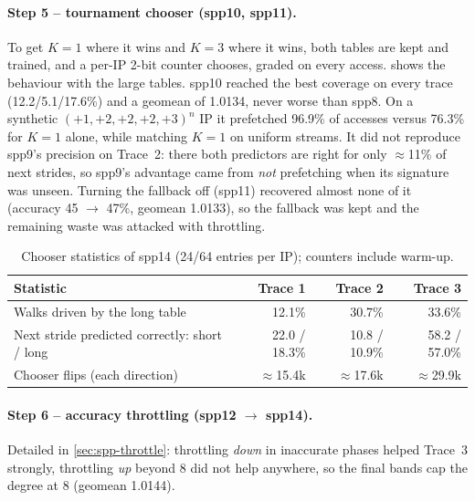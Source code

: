 \documentclass[11pt,a4paper]{article}
\theoremstyle{themethm}
\theoremstyle{themedef}
\theoremstyle{themeex}
\theoremstyle{themerem}
\newcommand{\tablesetup}{%
  \arrayrulecolor{tablerule}%
  \setlength{\aboverulesep}{0pt}\setlength{\belowrulesep}{0pt}%
  \renewcommand{\arraystretch}{1.3}%
  \rowcolors{2}{white}{tablerow}}
\newcommand{\colhead}[1]{\textbf{\color{tableheadtext}#1}}
\begin{document}
\paragraph{Step 5 -- tournament chooser (spp10, spp11).} To get $K=1$ where it
wins and $K=3$ where it wins, both tables are kept and trained, and a per-IP
2-bit counter chooses, graded on every access.  shows the
behaviour with the large tables. spp10 reached the best coverage on every trace
(12.2/5.1/17.6\%) and a geomean of 1.0134, never worse than spp8. On a
synthetic $(+1,+2,+2,+2,+3)^n$ IP it prefetched 96.9\% of accesses versus
76.3\% for $K=1$ alone, while matching $K=1$ on uniform streams. It did not
reproduce spp9's precision on Trace~2: there both predictors are right for only
$\approx$11\% of next strides, so spp9's advantage came from \emph{not}
prefetching when its signature was unseen. Turning the fallback off (spp11)
recovered almost none of it (accuracy 45 $\to$ 47\%, geomean 1.0133), so the
fallback was kept and the remaining waste was attacked with throttling.

\begin{table}[htbp]
\centering
\caption{Chooser statistics of spp14 (24/64 entries per IP); counters include warm-up.}\label{tab:chooser}
\tablesetup
\begin{tabular}{lrrr}
\toprule
\rowcolor{tablehead}\colhead{Statistic} & \colhead{Trace 1} & \colhead{Trace 2} & \colhead{Trace 3} \\
\midrule
Walks driven by the long table & 12.1\% & 30.7\% & 33.6\% \\
Next stride predicted correctly: short / long & 22.0 / 18.3\% & 10.8 / 10.9\% & 58.2 / 57.0\% \\
Chooser flips (each direction) & $\approx$15.4k & $\approx$17.6k & $\approx$29.9k \\
\bottomrule
\end{tabular}
\end{table}

\paragraph{Step 6 -- accuracy throttling (spp12 $\to$ spp14).} Detailed in
\cref{sec:spp-throttle}: throttling \emph{down} in inaccurate phases helped
Trace~3 strongly, throttling \emph{up} beyond 8 did not help anywhere, so the
final bands cap the degree at 8 (geomean 1.0144).
\end{document}
